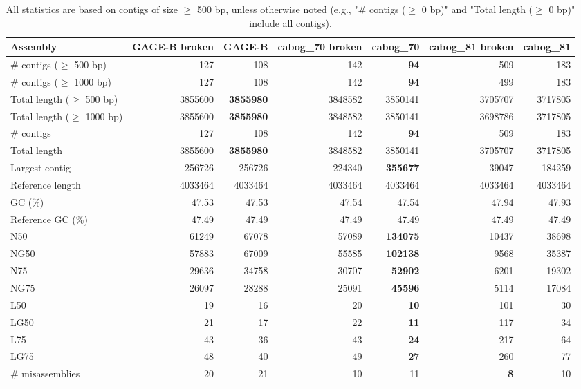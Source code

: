 \documentclass[12pt,a4paper]{article}
\begin{document}
\begin{table}[ht]
\begin{center}
\caption{All statistics are based on contigs of size $\geq$ 500 bp, unless otherwise noted (e.g., "\# contigs ($\geq$ 0 bp)" and "Total length ($\geq$ 0 bp)" include all contigs).}
\begin{tabular}{|l*{6}{|r}|}
\hline
Assembly & GAGE-B broken & GAGE-B & cabog\_70 broken & cabog\_70 & cabog\_81 broken & cabog\_81 \\ \hline
\# contigs ($\geq$ 500 bp) & 127 & 108 & 142 & {\bf 94} & 509 & 183 \\ \hline
\# contigs ($\geq$ 1000 bp) & 127 & 108 & 142 & {\bf 94} & 499 & 183 \\ \hline
Total length ($\geq$ 500 bp) & 3855600 & {\bf 3855980} & 3848582 & 3850141 & 3705707 & 3717805 \\ \hline
Total length ($\geq$ 1000 bp) & 3855600 & {\bf 3855980} & 3848582 & 3850141 & 3698786 & 3717805 \\ \hline
\# contigs & 127 & 108 & 142 & {\bf 94} & 509 & 183 \\ \hline
Total length & 3855600 & {\bf 3855980} & 3848582 & 3850141 & 3705707 & 3717805 \\ \hline
Largest contig & 256726 & 256726 & 224340 & {\bf 355677} & 39047 & 184259 \\ \hline
Reference length & 4033464 & 4033464 & 4033464 & 4033464 & 4033464 & 4033464 \\ \hline
GC (\%) & 47.53 & 47.53 & 47.54 & 47.54 & 47.94 & 47.93 \\ \hline
Reference GC (\%) & 47.49 & 47.49 & 47.49 & 47.49 & 47.49 & 47.49 \\ \hline
N50 & 61249 & 67078 & 57089 & {\bf 134075} & 10437 & 38698 \\ \hline
NG50 & 57883 & 67009 & 55585 & {\bf 102138} & 9568 & 35387 \\ \hline
N75 & 29636 & 34758 & 30707 & {\bf 52902} & 6201 & 19302 \\ \hline
NG75 & 26097 & 28288 & 25091 & {\bf 45596} & 5114 & 17084 \\ \hline
L50 & 19 & 16 & 20 & {\bf 10} & 101 & 30 \\ \hline
LG50 & 21 & 17 & 22 & {\bf 11} & 117 & 34 \\ \hline
L75 & 43 & 36 & 43 & {\bf 24} & 217 & 64 \\ \hline
LG75 & 48 & 40 & 49 & {\bf 27} & 260 & 77 \\ \hline
\# misassemblies & 20 & 21 & 10 & 11 & {\bf 8} & 10 \\ \hline

\end{tabular}
\end{center}
\end{table}
\end{document}
